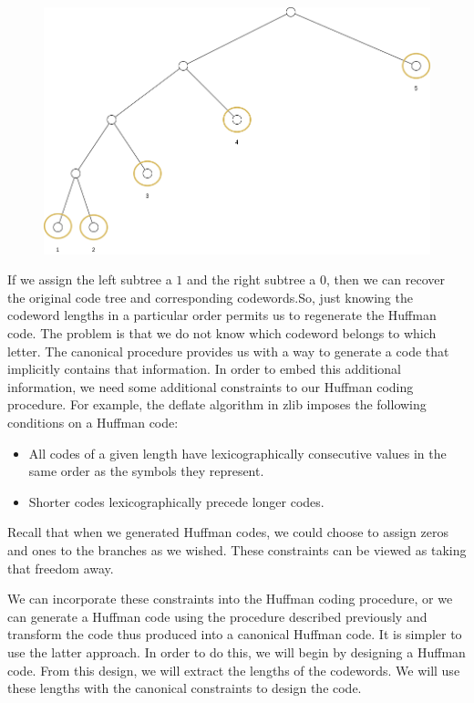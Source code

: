 \begin{figure}[H]
    \centering
    \includegraphics[scale=0.4]{images/2021-05-03_tree_02.png}
\end{figure}

If we assign the left subtree a $1$ and the right subtree a $0$, then we can recover the original code tree and corresponding codewords.So, just knowing the codeword lengths in a particular order permits us to regenerate the Huffman code. The problem is that we do not know which codeword belongs to which letter. The canonical procedure provides us with a way to generate a code that implicitly contains that information. In order to embed this additional information, we need some additional constraints to our Huffman coding procedure. For example, the deflate algorithm in zlib imposes the following conditions on a Huffman code:

\begin{itemize}
    \item All codes of a given length have lexicographically consecutive values in the same order as the symbols they represent.
    \item Shorter codes lexicographically precede longer codes.
\end{itemize}

 Recall that when we generated Huffman codes, we could choose to assign zeros and ones to the branches as we wished. These constraints can be viewed as taking that freedom away.

 We can incorporate these constraints into the Huffman coding procedure, or we can generate a Huffman code using the procedure described previously and transform the code thus produced into a canonical Huffman code. It is simpler to use the latter approach. In order to do this, we will begin by designing a Huffman code. From this design, we will extract the lengths of the codewords. We will use these lengths with the canonical constraints to design the code.

